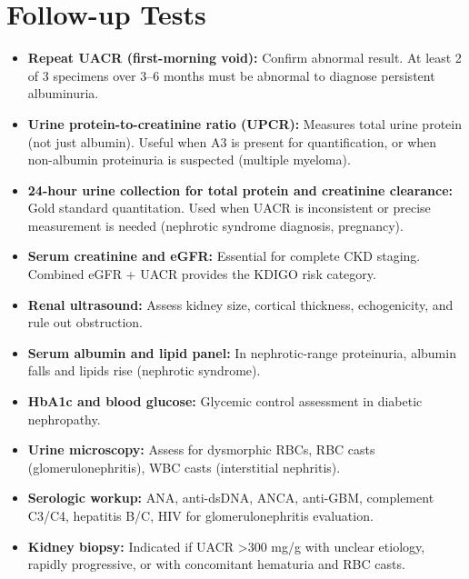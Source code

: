 \section*{Follow-up Tests}
\begin{itemize}
  \item \textbf{Repeat UACR (first-morning void):} Confirm abnormal result. At least 2 of 3 specimens over 3--6 months must be abnormal to diagnose persistent albuminuria.
  \item \textbf{Urine protein-to-creatinine ratio (UPCR):} Measures total urine protein (not just albumin). Useful when A3 is present for quantification, or when non-albumin proteinuria is suspected (multiple myeloma).
  \item \textbf{24-hour urine collection for total protein and creatinine clearance:} Gold standard quantitation. Used when UACR is inconsistent or precise measurement is needed (nephrotic syndrome diagnosis, pregnancy).
  \item \textbf{Serum creatinine and eGFR:} Essential for complete CKD staging. Combined eGFR + UACR provides the KDIGO risk category.
  \item \textbf{Renal ultrasound:} Assess kidney size, cortical thickness, echogenicity, and rule out obstruction.
  \item \textbf{Serum albumin and lipid panel:} In nephrotic-range proteinuria, albumin falls and lipids rise (nephrotic syndrome).
  \item \textbf{HbA1c and blood glucose:} Glycemic control assessment in diabetic nephropathy.
  \item \textbf{Urine microscopy:} Assess for dysmorphic RBCs, RBC casts (glomerulonephritis), WBC casts (interstitial nephritis).
  \item \textbf{Serologic workup:} ANA, anti-dsDNA, ANCA, anti-GBM, complement C3/C4, hepatitis B/C, HIV for glomerulonephritis evaluation.
  \item \textbf{Kidney biopsy:} Indicated if UACR >300 mg/g with unclear etiology, rapidly progressive, or with concomitant hematuria and RBC casts.
\end{itemize}


